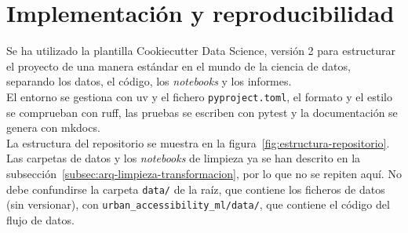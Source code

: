 \section{Implementación y reproducibilidad}
\label{sec:dis-implementacion}

Se ha utilizado la plantilla Cookiecutter Data Science, versión 2 \parencite{drivendata_2024} para estructurar el proyecto de una manera estándar en el mundo de la ciencia de datos, separando los datos, el código, los \textit{notebooks} y los informes.
\\

El entorno se gestiona con uv y el fichero \texttt{pyproject.toml}, el formato y el estilo se comprueban con ruff, las pruebas se escriben con pytest y la documentación se genera con mkdocs.
\\

La estructura del repositorio se muestra en la figura~\ref{fig:estructura-repositorio}. Las carpetas de datos y los \textit{notebooks} de limpieza ya se han descrito en la subsección~\ref{subsec:arq-limpieza-transformacion}, por lo que no se repiten aquí. No debe confundirse la carpeta \texttt{data/} de la raíz, que contiene los ficheros de datos (sin versionar), con \texttt{urban\_accessibility\_ml/data/}, que contiene el código del flujo de datos.
\\


